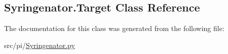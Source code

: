 \hypertarget{classSyringenator_1_1Target}{}\subsection{Syringenator.\+Target Class Reference}
\label{classSyringenator_1_1Target}


The documentation for this class was generated from the following file\+:\begin{DoxyCompactItemize}
\item 
src/pi/\mbox{\hyperlink{Syringenator_8py}{Syringenator.\+py}}\end{DoxyCompactItemize}
